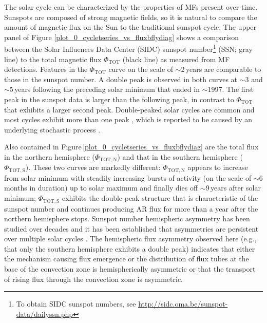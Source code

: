 \documentclass[namedreferences]{solarphysics}
\begin{document}
\begin{article}
The solar cycle can be characterized by the properties of MFs present over time. Sunspots are composed of strong magnetic fields, so it is natural to compare the amount of magnetic flux on the Sun to the traditional sunspot cycle. The upper panel of Figure \ref{plot_0_cycletseries_vs_fluxbflydiag} shows a comparison between the Solar Influences Data Center (SIDC) sunspot number\footnote{To obtain SIDC sunspot numbers, see \url{http://sidc.oma.be/sunspot-data/dailyssn.php}} (SSN; gray line) to the total magnetic flux $\Phi_{\mathrm{TOT}}$ (black line) as measured from MF detections. Features in the $\Phi_{\mathrm{TOT}}$ curve on the scale of $\sim$2\,years are comparable to those in the sunspot number. A double peak is observed in both curves at $\sim$3 and $\sim$5\,years following the preceding solar minimum that ended in $\sim$1997. The first peak in the sunspot data is larger than the following peak, in contrast to $\Phi_{\mathrm{TOT}}$ that exhibits a larger second peak. Double-peaked solar cycles are common and most cycles exhibit more than one peak \citep{gnevyshev:1977}, which is reported to be caused by an underlying stochastic process \citep{wang:2003a}.

Also contained in Figure\,\ref{plot_0_cycletseries_vs_fluxbflydiag} are the total flux in the northern hemisphere ($\Phi_\mathrm{TOT,N}$) and that in the southern hemisphere ($\Phi_\mathrm{TOT,S}$). These two curves are markedly different: $\Phi_\mathrm{TOT,N}$ appears to increase from solar minimum with steadily increasing bursts of activity (on the scale of $\sim$6 months in duration) up to solar maximum and finally dies off $\sim$9\,years after solar minimum; $\Phi_\mathrm{TOT,S}$ exhibits the double-peak structure that is characteristic of the sunspot number and continues producing AR flux for more than a year after the northern hemisphere stops. 
Sunspot number hemispheric asymmetry has been studied over decades \citep{Li:2001a,Temmer:2002} and it has been established that asymmetries are persistent over multiple solar cycles \citep{Temmer:2006}. The hemispheric flux asymmetry observed here (e.g., that only the southern hemisphere exhibits a double peak) indicates that either the mechanism causing flux emergence or the distribution of flux tubes at the base of the convection zone is hemispherically asymmetric or that the transport of rising flux through the convection zone is asymmetric. 







\end{article}
\end{document}
